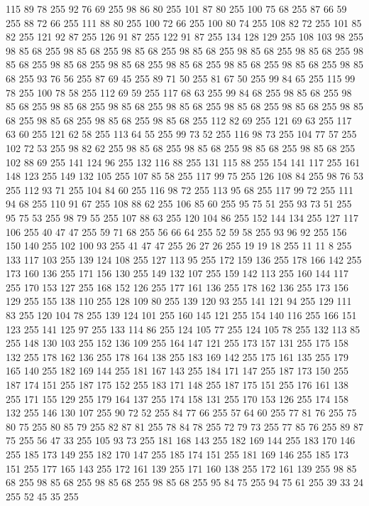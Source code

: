 115 89 78 255 92 76 69 255 98 86 80 255 101 87 80 255 100 75 68 255 87 66 59 255 88 72 66 255 111 88 80 255 100 72 66 255 100 80 74 255 108 82 72 255 101 85 82 255 121 92 87 255 126 91 87 255 122 91 87 255 134 128 129 255 108 103 98 255 98 85 68 255 98 85 68 255 98 85 68 255 98 85 68 255 98 85 68 255 98 85 68 255 98 85 68 255 98 85 68 255 98 85 68 255 98 85 68 255 98 85 68 255 98 85 68 255 98 85 68 255 93 76 56 255 87 69 45 255 89 71 50 255 81 67 50 255 99 84 65 255 115 99 78 255 100 78 58 255 112 69 59 255 117 68 63 255 99 84 68 255 98 85 68 255 98 85 68 255 98 85 68 255 98 85 68 255 98 85 68 255 98 85 68 255 98 85 68 255 98 85 68 255 98 85 68 255 98 85 68 255 98 85 68 255 112 82 69 255 121 69 63 255 117 63 60 255 121 62 58 255 113 64 55 255 99 73 52 255 116 98 73 255 104 77 57 255 102 72 53 255 98 82 62 255 98 85 68 255 98 85 68 255 98 85 68 255
98 85 68 255 102 88 69 255 141 124 96 255 132 116 88 255 131 115 88 255 154 141 117 255 161 148 123 255 149 132 105 255 107 85 58 255 117 99 75 255 126 108 84 255 98 76 53 255 112 93 71 255 104 84 60 255 116 98 72 255 113 95 68 255 117 99 72 255 111 94 68 255 110 91 67 255 108 88 62 255 106 85 60 255 95 75 51 255 93 73 51 255 95 75 53 255 98 79 55 255 107 88 63 255 120 104 86 255 152 144 134 255 127 117 106 255 40 47 47 255 59 71 68 255 56 66 64 255 52 59 58 255 93 96 92 255 156 150 140 255 102 100 93 255 41 47 47 255 26 27 26 255 19 19 18 255 11 11 8 255 133 117 103 255 139 124 108 255 127 113 95 255 172 159 136 255 178 166 142 255 173 160 136 255 171 156 130 255 149 132 107 255 159 142 113 255 160 144 117 255 170 153 127 255 168 152 126 255 177 161 136 255 178 162 136 255 173 156 129 255 155 138 110 255 128 109 80 255 139 120 93 255 141 121 94 255 129 111 83 255 120 104 78 255 139 124 101 255 160 145 121 255 154 140 116 255
166 151 123 255 141 125 97 255 133 114 86 255 124 105 77 255 124 105 78 255 132 113 85 255 148 130 103 255 152 136 109 255 164 147 121 255 173 157 131 255 175 158 132 255 178 162 136 255 178 164 138 255 183 169 142 255 175 161 135 255 179 165 140 255 182 169 144 255 181 167 143 255 184 171 147 255 187 173 150 255 187 174 151 255 187 175 152 255 183 171 148 255 187 175 151 255 176 161 138 255 171 155 129 255 179 164 137 255 174 158 131 255 170 153 126 255 174 158 132 255 146 130 107 255 90 72 52 255 84 77 66 255 57 64 60 255 77 81 76 255 75 80 75 255 80 85 79 255 82 87 81 255 78 84 78 255 72 79 73 255 77 85 76 255 89 87 75 255 56 47 33 255 105 93 73 255 181 168 143 255 182 169 144 255 183 170 146 255 185 173 149 255 182 170 147 255 185 174 151 255 181 169 146 255 185 173 151 255 177 165 143 255 172 161 139 255 171 160 138 255 172 161 139 255 98 85 68 255 98 85 68 255 98 85 68 255 98 85 68 255 95 84 75 255 94 75 61 255 39 33 24 255 52 45 35 255
